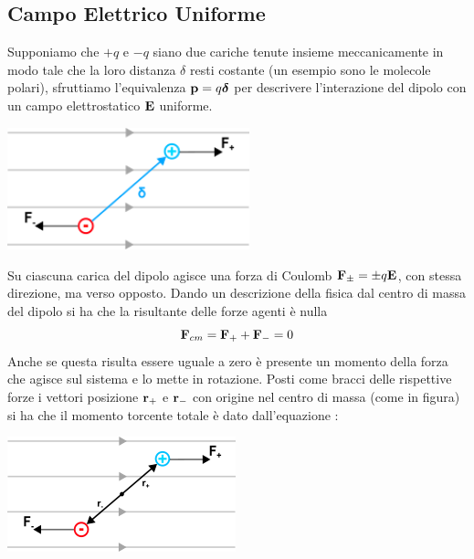 \subsection{Campo Elettrico Uniforme}
Supponiamo che $+q$ e $-q$ siano due cariche tenute insieme meccanicamente in modo tale che la loro distanza $\delta$ resti costante (un esempio sono le molecole polari), sfruttiamo l'equivalenza $\bold{p} = q \bm{\delta}$ per descrivere l'interazione del dipolo con un campo elettrostatico $\bold{E}$ uniforme.
\begin{center}
\end{center}
\begin{center}
	\includegraphics[width = 7cm]{images/fieldaction}
\end{center}

Su ciascuna carica del dipolo agisce una forza di Coulomb $\bold{F}_{\pm} = \pm q \bold{E}$, con stessa direzione, ma verso opposto. Dando un descrizione della fisica dal centro di massa del dipolo si ha che la risultante delle forze agenti \`e nulla
\begin{equation*}
	\bold{F}_{cm} = \bold{F}_{+} + \bold{F}_{-} = 0
\end{equation*}
Anche se questa risulta essere uguale a zero \`e presente un momento della forza che agisce sul sistema e lo mette in rotazione. Posti come bracci delle rispettive forze i vettori posizione $\bold{r}_{+}$ e $\bold{r}_{-}$ con origine nel centro di massa (come in figura) si ha che il momento torcente totale \`e dato dall'equazione :

\begin{center}
	\includegraphics{images/forcemoment}
\end{center}

